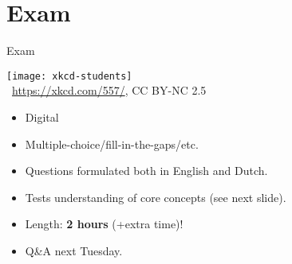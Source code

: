 \documentclass[../slides.tex]{subfiles}
\begin{document}
\section{Exam}

\begin{frame}{Exam}

\begin{center}
		\texttt{[image: xkcd-students]}\\
		{\tiny \textcopyright~\url{https://xkcd.com/557/}, CC BY-NC 2.5}
		\end{center}
	

	\begin{itemize}
	
		\item Digital
	
		\item Multiple-choice/fill-in-the-gaps/etc.
		
		\item Questions formulated both in English and Dutch.
		
		\item Tests understanding of core concepts (see next slide).
		
		\item Length: \textbf{2 hours} (+extra time)!
		
		\item Q\&A next Tuesday.
	
	\end{itemize}

\end{frame}
\end{document}
